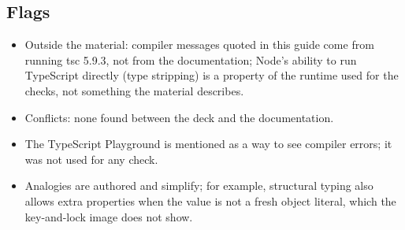 \documentclass[10pt]{article}
\begin{document}
\subsection*{Flags}
{\footnotesize\begin{itemize}
\item Outside the material: compiler messages quoted in this guide come from running tsc 5.9.3, not from the documentation; Node's ability to run TypeScript directly (type stripping) is a property of the runtime used for the checks, not something the material describes.
\item Conflicts: none found between the deck and the documentation.
\item The TypeScript Playground is mentioned as a way to see compiler errors; it was not used for any check.
\item Analogies are authored and simplify; for example, structural typing also allows extra properties when the value is not a fresh object literal, which the key-and-lock image does not show.
\end{itemize}}
\end{document}
